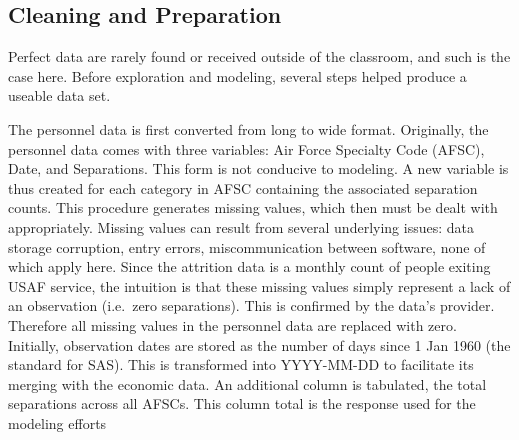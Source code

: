 \documentclass[12pt,letterpaper,toc=flat,oneside]{report}
\theoremstyle{definition}
\theoremstyle{definition}
\theoremstyle{definition}
\theoremstyle{remark}
\begin{document}
\begin{table}

\caption{\label{tab:econ-var}Selected Economic Indicators}
\centering
{}
\end{table}

\hypertarget{cleaning-and-preparation}{%
\subsection{Cleaning and Preparation}\label{cleaning-and-preparation}}

Perfect data are rarely found or received outside of the classroom, and
such is the case here. Before exploration and modeling, several steps
helped produce a useable data set.

The personnel data is first converted from long to wide format.
Originally, the personnel data comes with three variables: Air Force
Specialty Code (AFSC), Date, and Separations. This form is not conducive
to modeling. A new variable is thus created for each category in AFSC
containing the associated separation counts. This procedure generates
missing values, which then must be dealt with appropriately. Missing
values can result from several underlying issues: data storage
corruption, entry errors, miscommunication between software, none of
which apply here. Since the attrition data is a monthly count of people
exiting USAF service, the intuition is that these missing values simply
represent a lack of an observation (i.e.~zero separations). This is
confirmed by the data's provider. Therefore all missing values in the
personnel data are replaced with zero. Initially, observation dates are
stored as the number of days since 1 Jan 1960 (the standard for SAS).
This is transformed into YYYY-MM-DD to facilitate its merging with the
economic data. An additional column is tabulated, the total separations
across all AFSCs. This column total is the response used for the
modeling efforts
\end{document}
